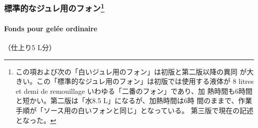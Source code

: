 \vspace*{1.7\zw}
\begin{recette}
\hypertarget{ux6a19ux6e96ux7684ux306aux30b8ux30e5ux30ecux7528ux306eux30d5ux30a9ux30f39}{%
\subsubsection[標準的なジュレ用のフォン]{\texorpdfstring{標準的なジュレ用のフォン\footnote{この項および次の「白いジュレ用のフォン」は初版と第二版以降の異同
  が大きい。この「標準的なジュレ用のフォン」は初版では使用する液体が 8
  litres et demi de remouillage いわゆる「二番のフォン」であり、加
  熱時間も6時間と短かい。第二版は「水8.5 L」になるが、加熱時間は6時
  間のままで、作業手順が「ソース用の白いフォンと同じ」となっている。
  第三版で現在の記述となった。}}{標準的なジュレ用のフォン}}\label{ux6a19ux6e96ux7684ux306aux30b8ux30e5ux30ecux7528ux306eux30d5ux30a9ux30f39}}

\hypertarget{fonds-pour-gelee-ordinaire}{%
\paragraph{Fonds pour gelée
ordinaire}\label{fonds-pour-gelee-ordinaire}}


（仕上り5 L分）


\end{recette}
